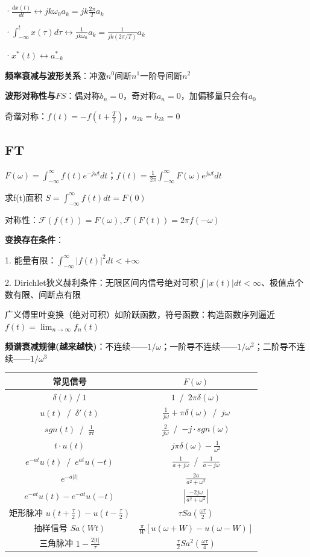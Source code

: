 ·$\frac{d x(t)}{d t} \longleftrightarrow j k \omega_{0} a_{k} = j k \frac{2 \pi}{T} a_{k}$

·$\int_{-\infty}^{t} x(\tau) d\tau \longleftrightarrow \frac{1}{j k \omega_{0}} a_{k} = \frac{1}{j k (2 \pi / T)} a_{k}$

·$x^{*}(t) \longleftrightarrow a_{-k}^{*}$

\textbf{频率衰减与波形关系}：冲激$n^0$间断$n^1$一阶导间断$n^2$

\textbf{波形对称性与$FS$}：偶对称$b_n=0$，奇对称$a_n=0$，加偏移量只会有$a_0$

奇谐对称：$f(t)=-f(t+\frac{T}{2})$，$a_{2k}=b_{2k}=0$

\subsection*{FT}

$F(\omega)=\int_{-\infty}^{\infty}f(t)e^{-j\omega t}dt$；$f(t)=\frac{1}{2\pi}\int_{-\infty}^{\infty}F(\omega)e^{j\omega t}dt$

求f(t)面积 $S=\int_{-\infty}^\infty f(t)dt=F(0)$

对称性：$\mathcal{F}(f(t))=F(\omega), \mathcal{F}(F(t))=2\pi f(-\omega)$

\textbf{变换存在条件}：

1. 能量有限：$\int_{-\infty}^{\infty}|f(t)|^2 dt<+\infty$

2. Dirichlet狄义赫利条件：无限区间内信号绝对可积$\int|x(t)|dt<\infty$、极值点个数有限、间断点有限

广义傅里叶变换（绝对可积）如阶跃函数，符号函数：构造函数序列逼近  
$f(t)=\lim_{n\rightarrow\infty} f_n(t)$

\textbf{频谱衰减规律(越来越快)}：不连续——$1/\omega$；一阶导不连续——$1/\omega^2$；二阶导不连续——$1/\omega^3$
\begin{center}
\begin{tabular}{|c|c|}
\hline
常见信号 & $F(\omega)$ \\
\hline
$\delta(t)~$/$~1$ & $1$~/~$2\pi\delta(\omega)$ \\
\hline
$u(t)$~/~$\delta'(t)$ & $\frac{1}{j\omega}+\pi\delta(\omega)$~/~$j\omega$ \\
\hline
$sgn(t)$~/~$\frac{1}{\pi t}$ & $\frac{2}{j\omega}$~/~$-j\cdot sgn(\omega)$ \\
\hline
$t\cdot u(t)$ & $j\pi\delta(\omega)-\frac{1}{\omega^2}$ \\
\hline
$e^{-at} u(t)$~/~$e^{at}u(-t)$ & $\frac{1}{a+j\omega}$~/~$\frac{1}{a-j\omega}$ \\
\hline
$e^{-a|t|}$ & $\frac{2a}{a^2 + \omega^2}$ \\
\hline
$e^{-at}u(t)-e^{-at}u(-t)$ & $|\frac{-2j\omega}{a^2 + \omega^2}|$ \\
\hline
矩形脉冲 $u(t+\frac{\tau}{2})-u(t-\frac{\tau}{2})$ & $\tau Sa(\frac{\omega\tau}{2})$ \\
\hline
抽样信号 $Sa(Wt)$ & $\frac{\pi}{W}[u(\omega+W)-u(\omega-W)]$ \\
\hline
三角脉冲 $1-\frac{2|t|}{\tau}$ & $\frac{\tau}{2} Sa^2(\frac{\omega\tau}{4})$ \\
\hline
\end{tabular}
\end{center}


